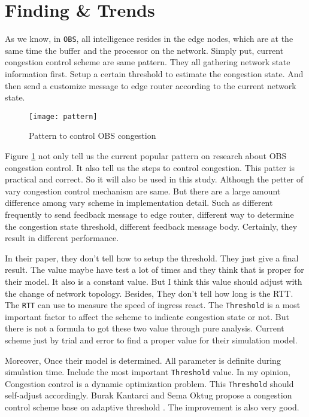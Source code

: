 \section{Finding \& Trends}
As we know, in \verb|OBS|, all intelligence resides in the edge nodes, which are at the same time the buffer and the processor on the network.     Simply put, current congestion control scheme are same pattern. They all gathering network state information first. Setup a certain threshold to estimate the congestion state. And then send a customize message to edge router according to the current network state. 


\begin{figure}[!htb]
    \label{fig:pattern}
    \begin{center}
        \leavevmode
        \ifpdf
        \else
        \texttt{[image: pattern]}
        \fi
        \caption{Pattern to control OBS congestion}
    \end{center}
\end{figure}

Figure \ref{fig:pattern} not only tell us the current popular pattern on research about OBS congestion control. It also tell us the steps to control congestion. This patter is practical and correct. So it will also be used in this study. Although the petter of vary congestion control mechanism are same. But there are a large amount difference among vary scheme in implementation detail. Such as different frequently to send feedback message to edge router, different way to
determine the congestion state threshold, different feedback message body. Certainly, they result in different performance. 

In their paper, they don't tell how to setup the threshold. They just give a final result. The value maybe have test a lot of times and they think that is proper for their model. It also is a constant value. But I think this value should adjust with the change of network topology. Besides, They don't tell how long is the RTT. The \verb|RTT| can use to measure the speed of ingress react. The \verb|Threshold| is a most important factor to affect the scheme to indicate congestion state or not.
But there is not a formula to got these two value through pure analysis. Current scheme just by trial and error to find a proper value for their simulation model.  

Moreover, Once their model is determined. All parameter is definite during simulation time. Include the most important \verb|Threshold| value. In my opinion, Congestion control is a dynamic optimization problem. This \verb|Threshold| should self-adjust accordingly. Burak Kantarci and Sema Oktug propose a congestion control scheme base on adaptive threshold \cite{adaptive}. The improvement is also very good. 


